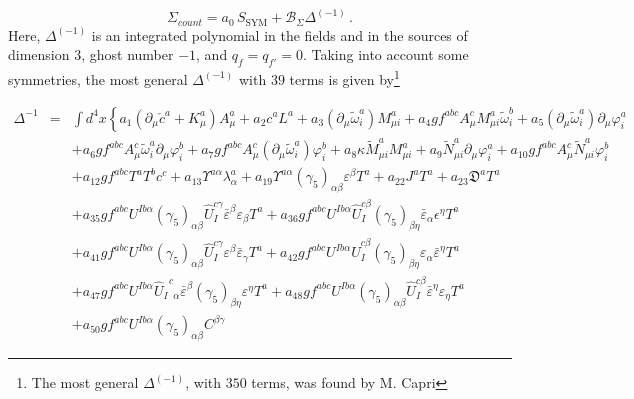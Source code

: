 \begin{appendix}
\begin{equation}
\label{count}
\Sigma_{count}=a_{0}\,S_{\mathrm{SYM}}+\mathcal{B}_{\Sigma}\Delta^{(-1)}\,.
\end{equation}
Here, $\Delta^{(-1)}$ is an integrated polynomial in the fields and in the sources of dimension $3$, ghost number $-1$,  and $q_{f}=q_{f'}=0$. Taking into account some symmetries, the most general $\Delta^{(-1)}$ with $39$ terms is given by\footnote{The most general $\Delta^{(-1)}$, with $350$ terms, was found by M. Capri}


\begin{eqnarray}
\Delta^{-1} &=& \int d^{4}x \left\{ 
  a_{1}(\partial_{\mu}\check{c}^{a}+K^{a}_{\mu})A^{a}_{\mu}
+ a_{2}c^{a}L^{a}
+ a_{3}(\partial_{\mu}\tilde{\omega}^{a}_{i})M^{a}_{\mu i}
+ a_{4}gf^{abc}A^{c}_{\mu}M^{a}_{\mu i}\tilde{\omega}^{b}_{i}
+ a_{5}(\partial_{\mu}\tilde{\omega}^{a}_{i})\partial_{\mu}\varphi^{a}_{i}
\right. \nonumber \\
&&
+ a_{6}gf^{abc}A^{c}_{\mu}\tilde{\omega}^{a}_{i}\partial_{\mu}\varphi^{b}_{i}
+ a_{7}gf^{abc}A^{c}_{\mu}(\partial_{\mu}\tilde{\omega}^{a}_{i})\varphi^{b}_{i}
+ a_{8}\kappa\tilde{M}^{a}_{\mu i}M^{a}_{\mu i}
+ a_{9}\tilde{N}^{a}_{\mu i}\partial_{\mu}\varphi^{a}_{i}
+ a_{10}gf^{abc}A^{c}_{\mu}\tilde{N}^{a}_{\mu i}\varphi^{b}_{i}
\nonumber \\
&&
+ a_{12}gf^{abc}T^{a}T^{b}c^{c}
+ a_{13}\varUpsilon^{a\alpha}\lambda^{a}_{\alpha}
+ a_{19}\varUpsilon^{a\alpha}(\gamma_{5})_{\alpha\beta}\varepsilon^{\beta}T^{a}
+ a_{22}J^{a}T^{a}
+ a_{23}\mathfrak{D}^{a}T^{a}
\nonumber \\
&&
+ a_{35}gf^{abc}U^{Ib\alpha}(\gamma_{5})_{\alpha\beta}\hat{U}_{I}^{c\gamma}
\bar{\varepsilon}^{\beta}\varepsilon_{\beta}T^{a}
+ a_{36}gf^{abc}U^{Ib\alpha}\hat{U}_{I}^{c\beta}(\gamma_{5})_{\beta\eta}
\bar{\varepsilon}_{\alpha}\epsilon^{\eta}T^{a}
\nonumber \\
&&
+ a_{41}gf^{abc}U^{Ib\alpha}(\gamma_{5})_{\alpha\beta}\hat{U}_{I}^{c\gamma}
\varepsilon^{\beta}\bar{\varepsilon}_{\gamma}T^{a}
+ a_{42}gf^{abc}U^{Ib\alpha}\hat{U}_{I}^{c\beta}(\gamma_{5})_{\beta\eta}
\varepsilon_{\alpha}\bar{\varepsilon}^{\eta}T^{a}
\nonumber \\
&&
+ a_{47}gf^{abc}U^{Ib\alpha}\hat{U}_{I\;\;\alpha}^{\;\;c}\bar{\varepsilon}^{\beta}
(\gamma_{5})_{\beta\eta}\varepsilon^{\eta}T^{a}
+ a_{48}gf^{abc}U^{Ib\alpha}
(\gamma_{5})_{\alpha\beta}\hat{U}_{I}^{c\beta}\bar{\varepsilon}^{\eta}
\varepsilon_{\eta}T^{a}
\nonumber \\
&&
+ a_{50}gf^{abc}U^{Ib\alpha}(\gamma_{5})_{\alpha\beta}C^{\beta\gamma}

\end{eqnarray}
\end{appendix}

